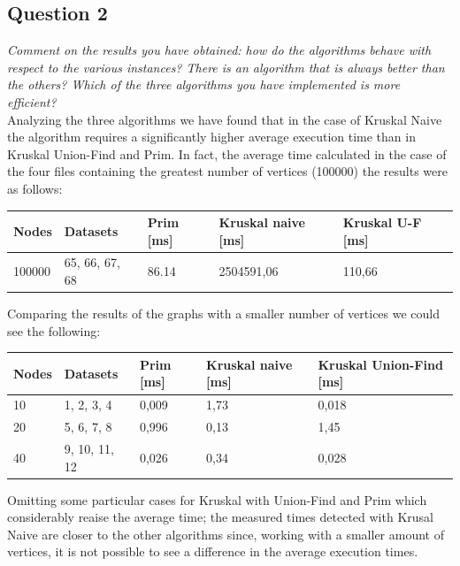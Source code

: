 \subsection{Question 2}
\textit{Comment on the results you have obtained: how do the algorithms behave with respect to the various 
instances? There is an algorithm that is always better than the others? Which of the three algorithms you 
have implemented is more efficient?} \\

\noindent
Analyzing the three algorithms we have found that in the case of Kruskal Naive the algorithm requires a 
significantly higher average execution time than in Kruskal Union-Find and Prim. In fact, the average time 
calculated in the case of the four files containing the greatest number of vertices (100000) the results 
were as follows:
\begin{table}[H]\centering
    \begin{tabular}{l|l|l|l|l}
        \textbf{Nodes} & \textbf{Datasets} & \textbf{Prim [ms]} & \textbf{Kruskal naive [ms]} & \textbf{Kruskal U-F [ms]}\\
    \hline
        100000 & 65, 66, 67, 68 & 86.14 & 2504591,06 & 110,66 
    \end{tabular}
\end{table}
\noindent
Comparing the results of the graphs with a smaller number of vertices we could see the following:
\begin{table}[H]\centering
    \begin{tabular}{l|l|l|l|l}
        \textbf{Nodes} & \textbf{Datasets} & \textbf{Prim [ms]} & \textbf{Kruskal naive [ms]} & \textbf{Kruskal Union-Find [ms]} \\
    \hline
        10 & 1, 2, 3, 4     & 0,009  & 1,73  & 0,018  \\
        20 & 5, 6, 7, 8     & 0,996  & 0,13  & 1,45   \\
        40 & 9, 10, 11, 12  & 0,026  & 0,34  & 0,028  \\
    \end{tabular}
\end{table}
\noindent
Omitting some particular cases for Kruskal with Union-Find and Prim which considerably reaise the average 
time; the measured times detected with Krusal Naive are closer to the other algorithms since, working with 
a smaller amount of vertices, it is not possible to see a difference in the average execution times.

